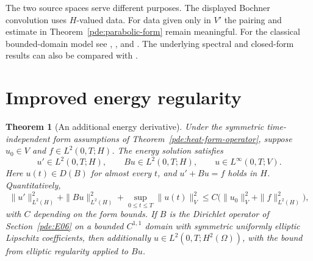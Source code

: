 \documentclass[11pt,oneside,openany]{book}
\theoremstyle{plain}
\newtheorem{theorem}{Theorem}[chapter]
\theoremstyle{definition}
\theoremstyle{remark}
\begin{document}
The two source spaces serve different purposes.
The displayed Bochner convolution uses \(H\)-valued data.
For data given only in \(V'\) the pairing and estimate in
Theorem~\ref{pde:parabolic-form} remain meaningful.
For the classical bounded-domain model see
\cite[Chapter 6, \S 1]{TaylorI}, \cite[\S 10.1]{Brezis}, and
\cite[\S 7.4]{Evans}. The underlying spectral and closed-form
results can also be compared with \cite{D16}.

\section{Improved energy regularity}
\label{pde:H08}

\begin{theorem}[An additional energy derivative]
\label{pde:heat-improved}
Under the symmetric time-independent form assumptions of
Theorem~\ref{pde:heat-form-operator}, suppose \(u_0\in V\)
and \(f\in L^2(0,T;H)\). The energy solution satisfies
\[
 u'\in L^2(0,T;H),\qquad
 Bu\in L^2(0,T;H),\qquad
 u\in L^\infty(0,T;V).
\]
Here \(u(t)\in D(B)\) for almost every \(t\), and
\(u'+Bu=f\) holds in \(H\). Quantitatively,
\[
 \|u'\|_{L^2(H)}^2+\|Bu\|_{L^2(H)}^2+
      \sup_{0\leq t\leq T}\|u(t)\|_V^2
 \leq C\bigl(\|u_0\|_V^2+\|f\|_{L^2(H)}^2\bigr),
\]
with \(C\) depending on the form bounds.
If \(B\) is the Dirichlet operator of Section~\ref{pde:E06}
on a bounded \(C^{1,1}\) domain with symmetric uniformly elliptic
Lipschitz coefficients, then additionally
\(u\in L^2(0,T;H^2(\Omega))\), with the bound from elliptic
regularity applied to \(Bu\).
\end{theorem}
\end{document}
